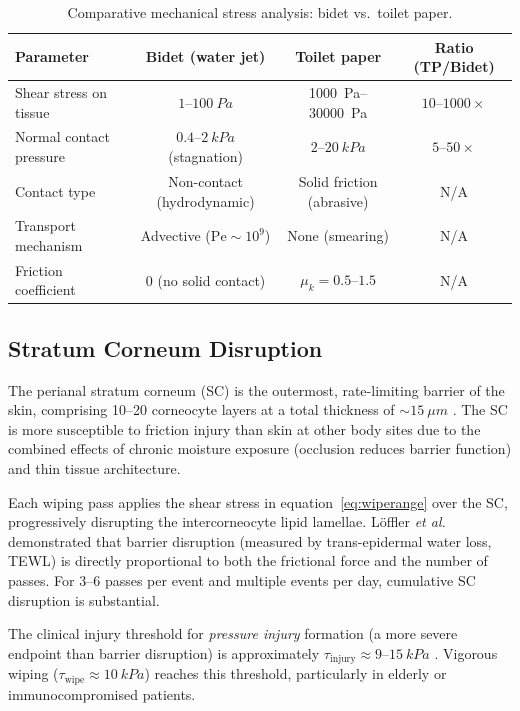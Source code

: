 \documentclass[10pt,letterpaper]{article}
\newcommand{\Pe}{\mathrm{Pe}}
\begin{document}
\begin{table}[h!]
\centering
\caption{Comparative mechanical stress analysis: bidet vs.\ toilet paper.}
\label{tab:stresscomparison}
\begin{tabular}{lccc}
\toprule
\textbf{Parameter} & \textbf{Bidet (water jet)} & \textbf{Toilet paper} & \textbf{Ratio (TP/Bidet)}\\
\midrule
Shear stress on tissue     & $1$--$100~Pa$    & 1000~Pa--30000~Pa & $10$--$1000\times$\\
Normal contact pressure    & $0.4$--$2~kPa$ (stagnation) & $2$--$20~kPa$ & $5$--$50\times$\\
Contact type               & Non-contact (hydrodynamic) & Solid friction (abrasive) & N/A\\
Transport mechanism        & Advective ($\Pe \sim 10^9$)   & None (smearing)         & N/A\\
Friction coefficient       & $0$ (no solid contact) & $\mu_k = 0.5$--$1.5$   & N/A\\
\bottomrule
\end{tabular}
\end{table}

\subsection{Stratum Corneum Disruption}
\label{subsec:SC}

The perianal stratum corneum (SC) is the outermost, rate-limiting barrier
of the skin, comprising 10--20 corneocyte layers at a total thickness of
$\sim15~\mu  m$ \citep{Loden2012}. The SC is more susceptible to
friction injury than skin at other body sites due to the combined effects
of chronic moisture exposure (occlusion reduces barrier function) and thin
tissue architecture.

Each wiping pass applies the shear stress in equation~\eqref{eq:wiperange}
over the SC, progressively disrupting the intercorneocyte lipid lamellae.
L\"offler \textit{et al.}\ \citep{Loffler2004} demonstrated that barrier
disruption (measured by trans-epidermal water loss, TEWL) is directly
proportional to both the frictional force and the number of passes.
For 3--6 passes per event and multiple events per day, cumulative SC
disruption is substantial.

The clinical injury threshold for \emph{pressure injury} formation (a more
severe endpoint than barrier disruption) is approximately
$\tau_\mathrm{injury} \approx 9$--$15~kPa$ \citep{Broderick2021}.
Vigorous wiping ($\tau_\mathrm{wipe} \approx 10~kPa$) reaches this
threshold, particularly in elderly or immunocompromised patients.
\end{document}
